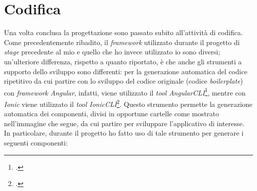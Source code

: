 
\section{Codifica}

Una volta conclusa la progettazione sono passato subito all'attività di codifica. Come precedentemente ribadito, il \textit{framework} utilizzato durante il progetto di \textit{stage} precedente al mio e quello che ho invece utilizzato io sono diversi; un'ulteriore differenza, rispetto a quanto riportato, è che anche gli strumenti a supporto dello sviluppo sono differenti: per la generazione automatica del codice ripetitivo da cui partire con lo sviluppo del codice originale (codice \textit{boilerplate}) con \textit{framework Angular}, infatti, viene utilizzato il \textit{tool AngularCLI}\footcite{tec:angularcli}, mentre con \textit{Ionic} viene utilizzato il \textit{tool IonicCLI}\footcite{tec:ioniccli}. Questo strumento permette la generazione automatica dei componenti, divisi in opportune cartelle come mostrato nell'immagine che segue, da cui partire per sviluppare l'applicativo di interesse. In particolare, durante il progetto ho fatto uso di tale strumento per generare i seguenti componenti:
